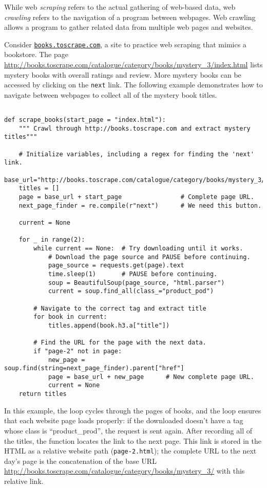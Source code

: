 While web \emph{scraping} refers to the actual gathering of web-based data, web \emph{crawling} refers to the navigation of a program between webpages.
Web crawling allows a program to gather related data from multiple web pages and websites.

Consider \href{http://books.toscrape.com}{\texttt{books.toscrape.com}}, a site to practice web scraping that mimics a bookstore.
The page \url{http://books.toscrape.com/catalogue/category/books/mystery_3/index.html} lists mystery books with overall ratings and review.
More mystery books can be accessed by clicking on the \texttt{next} link.
The following example demonstrates how to navigate between webpages to collect all of the mystery book titles.

\begin{lstlisting}

def scrape_books(start_page = "index.html"):
    """ Crawl through http://books.toscrape.com and extract mystery titles"""

    # Initialize variables, including a regex for finding the 'next' link.
    base_url="http://books.toscrape.com/catalogue/category/books/mystery_3/"
    titles = []
    page = base_url + start_page                # Complete page URL.
    next_page_finder = re.compile(r"next")      # We need this button.

    current = None

    for _ in range(2):
        while current == None:  # Try downloading until it works.
            # Download the page source and PAUSE before continuing.
            page_source = requests.get(page).text
            time.sleep(1)       # PAUSE before continuing.
            soup = BeautifulSoup(page_source, "html.parser")
            current = soup.find_all(class_="product_pod")

        # Navigate to the correct tag and extract title
        for book in current:
            titles.append(book.h3.a["title"])

        # Find the URL for the page with the next data.
        if "page-2" not in page:
            new_page = soup.find(string=next_page_finder).parent["href"]
            page = base_url + new_page      # New complete page URL.
            current = None
    return titles

\end{lstlisting}

In this example, the  loop cycles through the pages of books, and the  loop ensures that each website page loads properly: if the downloaded  doesn't have a tag whose class is ``product\_prod'', the request is sent again.
After recording all of the titles, the function locates the link to the next page.
This link is stored in the HTML as a relative website path (\texttt{page-2.html}); the complete URL to the next day's page is the concatenation of the base URL \url{http://books.toscrape.com/catalogue/category/books/mystery_3/} with this relative link.

